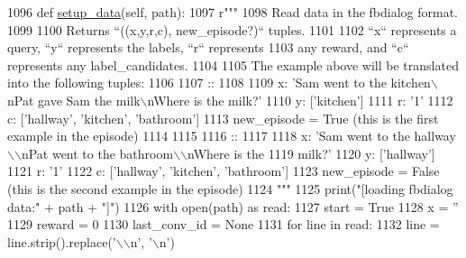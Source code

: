 \begin{DoxyCode}
1096     \textcolor{keyword}{def }\hyperlink{namespaceparlai_1_1tasks_1_1aqua_1_1agents_a2d4e9f4e80d4edc0646c7e3d52be9f25}{setup\_data}(self, path):
1097         \textcolor{stringliteral}{r"""}
1098 \textcolor{stringliteral}{        Read data in the fbdialog format.}
1099 \textcolor{stringliteral}{}
1100 \textcolor{stringliteral}{        Returns ``((x,y,r,c), new\_episode?)`` tuples.}
1101 \textcolor{stringliteral}{}
1102 \textcolor{stringliteral}{        ``x`` represents a query, ``y`` represents the labels, ``r`` represents}
1103 \textcolor{stringliteral}{        any reward, and ``c`` represents any label\_candidates.}
1104 \textcolor{stringliteral}{}
1105 \textcolor{stringliteral}{        The example above will be translated into the following tuples:}
1106 \textcolor{stringliteral}{}
1107 \textcolor{stringliteral}{        ::}
1108 \textcolor{stringliteral}{}
1109 \textcolor{stringliteral}{            x: 'Sam went to the kitchen\(\backslash\)nPat gave Sam the milk\(\backslash\)nWhere is the milk?'}
1110 \textcolor{stringliteral}{            y: ['kitchen']}
1111 \textcolor{stringliteral}{            r: '1'}
1112 \textcolor{stringliteral}{            c: ['hallway', 'kitchen', 'bathroom']}
1113 \textcolor{stringliteral}{            new\_episode = True (this is the first example in the episode)}
1114 \textcolor{stringliteral}{}
1115 \textcolor{stringliteral}{}
1116 \textcolor{stringliteral}{        ::}
1117 \textcolor{stringliteral}{}
1118 \textcolor{stringliteral}{            x: 'Sam went to the hallway\(\backslash\)\(\backslash\)nPat went to the bathroom\(\backslash\)\(\backslash\)nWhere is the}
1119 \textcolor{stringliteral}{                milk?'}
1120 \textcolor{stringliteral}{            y: ['hallway']}
1121 \textcolor{stringliteral}{            r: '1'}
1122 \textcolor{stringliteral}{            c: ['hallway', 'kitchen', 'bathroom']}
1123 \textcolor{stringliteral}{            new\_episode = False (this is the second example in the episode)}
1124 \textcolor{stringliteral}{        """}
1125         print(\textcolor{stringliteral}{"[loading fbdialog data:"} + path + \textcolor{stringliteral}{"]"})
1126         with open(path) \textcolor{keyword}{as} read:
1127             start = \textcolor{keyword}{True}
1128             x = \textcolor{stringliteral}{''}
1129             reward = 0
1130             last\_conv\_id = \textcolor{keywordtype}{None}
1131             \textcolor{keywordflow}{for} line \textcolor{keywordflow}{in} read:
1132                 line = line.strip().replace(\textcolor{stringliteral}{'\(\backslash\)\(\backslash\)n'}, \textcolor{stringliteral}{'\(\backslash\)n'})

\end{DoxyCode}
